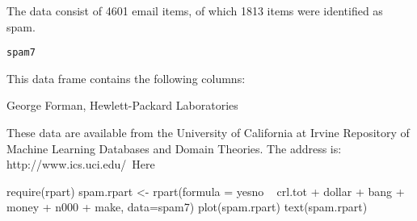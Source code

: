 \begin{Description}\relax
The data consist of 4601 email items, of which 1813 items were identified
as spam.
\end{Description}
\begin{Usage}
\begin{verbatim}spam7\end{verbatim}
\end{Usage}
\begin{Format}\relax
This data frame contains the following columns:
\end{Format}
\begin{Source}\relax
George Forman, Hewlett-Packard Laboratories

These data are available from the University
of California at Irvine Repository of Machine Learning Databases
and Domain Theories. The address is:  http://www.ics.uci.edu/~Here
\end{Source}
\begin{Examples}
\begin{ExampleCode}
require(rpart)
spam.rpart <- rpart(formula = yesno ~ crl.tot + dollar + bang +
   money + n000 + make, data=spam7)
plot(spam.rpart)
text(spam.rpart)

\end{ExampleCode}
\end{Examples}

